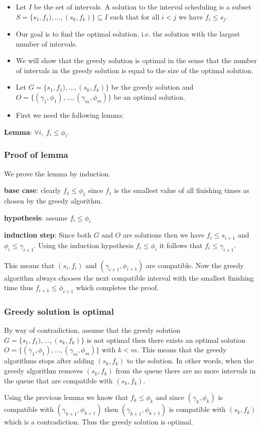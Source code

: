 \documentclass{beamer}
\begin{document}
\begin{frame}
  \begin{itemize}
  \item Let $I$ be the set of intervals. A solution to the interval scheduling is a subset $S=\{s_1,f_1),\ldots,(s_k,f_k)\}\subseteq I$ such that
for all $i<j$ we have $f_i\le s_j$.
\item  Our goal is to find the optimal solution, i.e. the solution with the largest number of intervals.
\item We will show that the greedy solution is optimal in the sense that the number of intervals in the greedy solution is equal to the size of the optimal solution.   
\item  Let $G=\{s_1,f_1),\ldots,(s_k,f_k)\}$ be the greedy solution and $O=\{(\gamma_1,\phi_1),\ldots,(\gamma_m,\phi_m) \}$ be an optimal solution.
\item First we need the following lemma:
  \end{itemize}

\textbf{Lemma}: $\forall i,\ f_i\le\phi_i$.

\end{frame}
\begin{frame}
  \frametitle{Proof of lemma}
  We prove the lemma by induction.

\textbf{base case}: clearly $f_1\le\phi_1$ since $f_1$ is the smallest value of all finishing times as chosen by the greedy algorithm.

\textbf{hypothesis}: assume $f_i\le\phi_i$

\textbf{induction step}: Since both $G$ and $O$ are solutions then we have $f_i\le s_{i+1}$ and $\phi_i\le\gamma_{i+1}$. Using the induction hypothesis $f_i\le\phi_i$ it follows that $f_i\le\gamma_{i+1}$.

This means that $(s_i,f_i)$ and $(\gamma_{i+1},\phi_{i+1})$ are compatible. Now the greedy algorithm always chooses the next compatible interval with the smallest finishing time thus $f_{i+1}\le\phi_{i+1}$ which completes the proof.

\end{frame}
\begin{frame}
  \frametitle{Greedy solution is optimal}

By way of contradiction, assume that the greedy solution $G=\{s_1,f_1),\ldots,(s_k,f_k)\}$ is not optimal then there exists an optimal solution $O=\{(\gamma_1,\phi_1),\ldots,(\gamma_m,\phi_m) \}$ with $k<m$. This means that the greedy algorithms stops after adding $(s_k,f_k)$ to the solution. In other words, when the greedy algorithm removes $(s_k,f_k)$ from the queue there are no more intervals in the queue that are compatible with $(s_k,f_k)$.

Using the previous lemma we know that $f_k\le\phi_k$ and since $(\gamma_k,\phi_k)$ is compatible with $(\gamma_{k+1},\phi_{k+1})$ then $(\gamma_{k+1},\phi_{k+1})$  is compatible with $(s_k,f_k)$ which is a contradiction. Thus the greedy solution is optimal.
\end{frame}
\end{document}
